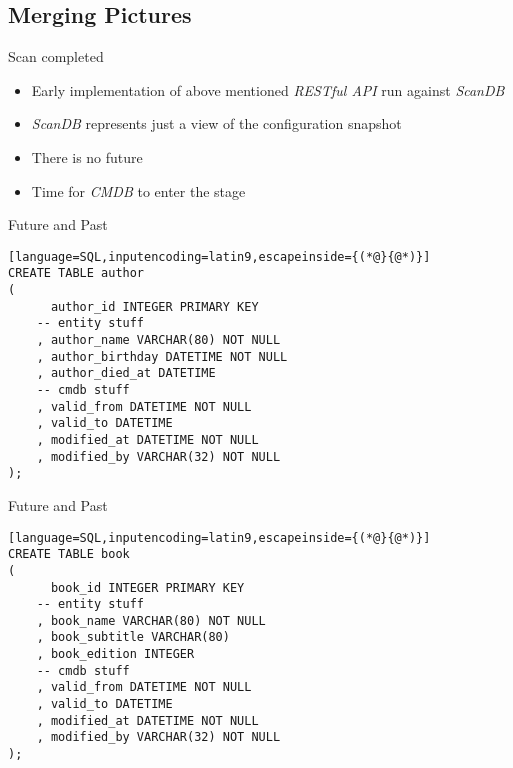 \documentclass[ngerman,xcolor={table,dvipsnames},smaller,compress,hyperref={bookmarks,colorlinks}]{beamer}%
\begin{document}
\subsection{Merging Pictures}

\begin{frame}[fragile]{}
\begin{block}{Scan completed}
\begin{itemize}
\item Early implementation of above mentioned \textit{RESTful API} run against \textit{ScanDB}
\item<2-> \textit{ScanDB} represents just a view of the configuration snapshot
\item<3-> There is no future
\item<5-> Time for \textit{CMDB} to enter the stage
\end{itemize}
\end{block}
\end{frame}

\begin{frame}[fragile]{}
\begin{block}{Future and Past}
\scriptsize
\begin{lstlisting}[language=SQL,inputencoding=latin9,escapeinside={(*@}{@*)}]
CREATE TABLE author
(
      author_id INTEGER PRIMARY KEY
    -- entity stuff
    , author_name VARCHAR(80) NOT NULL
    , author_birthday DATETIME NOT NULL
    , author_died_at DATETIME
    -- cmdb stuff
    , valid_from DATETIME NOT NULL
    , valid_to DATETIME
    , modified_at DATETIME NOT NULL
    , modified_by VARCHAR(32) NOT NULL
);
\end{lstlisting}
\end{block}
\end{frame}

\begin{frame}[fragile]{}
\begin{block}{Future and Past}
\scriptsize
\begin{lstlisting}[language=SQL,inputencoding=latin9,escapeinside={(*@}{@*)}]
CREATE TABLE book
(
      book_id INTEGER PRIMARY KEY
    -- entity stuff
    , book_name VARCHAR(80) NOT NULL
    , book_subtitle VARCHAR(80)
    , book_edition INTEGER
    -- cmdb stuff
    , valid_from DATETIME NOT NULL
    , valid_to DATETIME
    , modified_at DATETIME NOT NULL
    , modified_by VARCHAR(32) NOT NULL
);
\end{lstlisting}
\end{block}
\end{frame}
\end{document}
